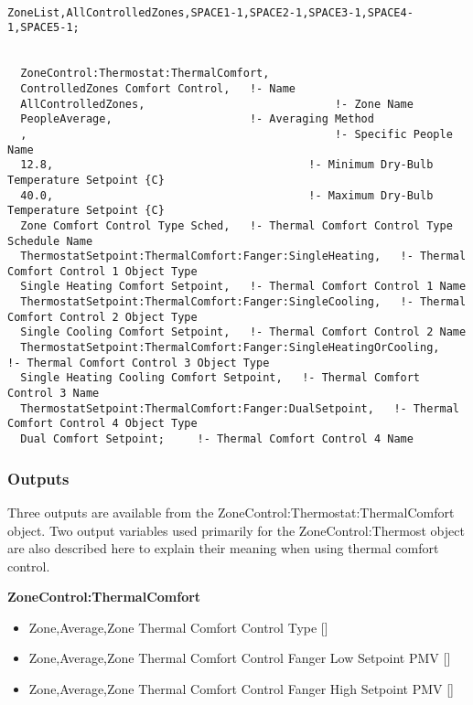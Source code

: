 \begin{lstlisting}

ZoneList,AllControlledZones,SPACE1-1,SPACE2-1,SPACE3-1,SPACE4-1,SPACE5-1;


  ZoneControl:Thermostat:ThermalComfort,
  ControlledZones Comfort Control,   !- Name
  AllControlledZones,                             !- Zone Name
  PeopleAverage,                     !- Averaging Method
  ,                                               !- Specific People Name
  12.8,                                       !- Minimum Dry-Bulb Temperature Setpoint {C}
  40.0,                                       !- Maximum Dry-Bulb Temperature Setpoint {C}
  Zone Comfort Control Type Sched,   !- Thermal Comfort Control Type Schedule Name
  ThermostatSetpoint:ThermalComfort:Fanger:SingleHeating,   !- Thermal Comfort Control 1 Object Type
  Single Heating Comfort Setpoint,   !- Thermal Comfort Control 1 Name
  ThermostatSetpoint:ThermalComfort:Fanger:SingleCooling,   !- Thermal Comfort Control 2 Object Type
  Single Cooling Comfort Setpoint,   !- Thermal Comfort Control 2 Name
  ThermostatSetpoint:ThermalComfort:Fanger:SingleHeatingOrCooling,   !- Thermal Comfort Control 3 Object Type
  Single Heating Cooling Comfort Setpoint,   !- Thermal Comfort Control 3 Name
  ThermostatSetpoint:ThermalComfort:Fanger:DualSetpoint,   !- Thermal Comfort Control 4 Object Type
  Dual Comfort Setpoint;     !- Thermal Comfort Control 4 Name
\end{lstlisting}

\subsubsection{Outputs}\label{outputs-3-024}

Three outputs are available from the ZoneControl:Thermostat:ThermalComfort object. Two output variables used primarily for the ZoneControl:Thermost object are also described here to explain their meaning when using thermal comfort control.

\textbf{ZoneControl:ThermalComfort}

\begin{itemize}
\item
  Zone,Average,Zone Thermal Comfort Control Type {[]}
\item
  Zone,Average,Zone Thermal Comfort Control Fanger Low Setpoint PMV {[]}
\item
  Zone,Average,Zone Thermal Comfort Control Fanger High Setpoint PMV {[]}
\end{itemize}

